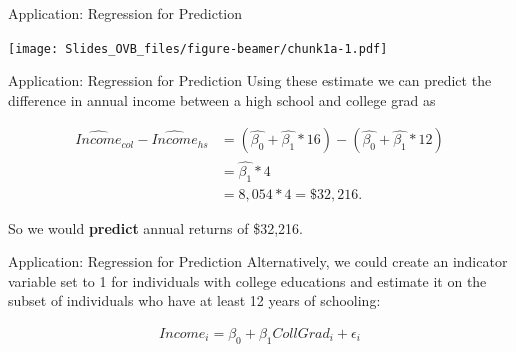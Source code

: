 \documentclass[
  ignorenonframetext,
]{beamer}
\newenvironment{Shaded}{\begin{snugshade}}{\end{snugshade}}
\newcommand{\DecValTok}[1]{\textcolor[rgb]{0.00,0.00,0.81}{#1}}
\newcommand{\KeywordTok}[1]{\textcolor[rgb]{0.13,0.29,0.53}{\textbf{#1}}}
\newcommand{\NormalTok}[1]{#1}
\newcommand{\OperatorTok}[1]{\textcolor[rgb]{0.81,0.36,0.00}{\textbf{#1}}}
\begin{document}
\begin{frame}[fragile]{Application: Regression for Prediction}
\protect\hypertarget{application-regression-for-prediction-4}{}
\tiny

\begin{Shaded}
\end{Shaded}

\texttt{[image: Slides\_OVB\_files/figure-beamer/chunk1a-1.pdf]}
\end{frame}

\begin{frame}{Application: Regression for Prediction}
\protect\hypertarget{application-regression-for-prediction-5}{}
Using these estimate we can predict the difference in annual income
between a high school and college grad as

\[\begin{aligned}
\widehat{Income}_{col}-\widehat{Income}_{hs} & =(\hat{\beta_0}+\hat{\beta_1}*16)-(\hat{\beta_0}+\hat{\beta_1}*12)\\
& =\hat{\beta_1}*4\\
& = 8,054*4=\$32,216.
\end{aligned}\]

So we would \textbf{predict} annual returns of \$32,216.
\end{frame}

\begin{frame}{Application: Regression for Prediction}
\protect\hypertarget{application-regression-for-prediction-6}{}
Alternatively, we could create an indicator variable set to 1 for
individuals with college educations and estimate it on the subset of
individuals who have at least 12 years of schooling:

\begin{equation}
\begin{split}
Income_i=\beta_0+\beta_1 CollGrad_i+\epsilon_i
\end{split}
\end{equation}
\end{frame}
\end{document}
